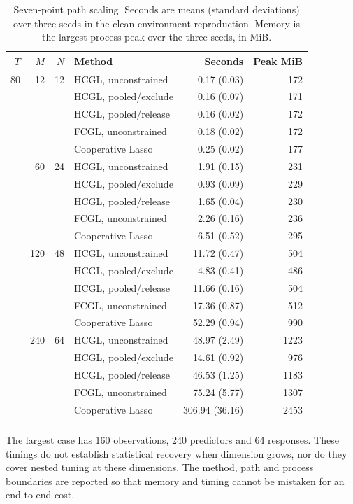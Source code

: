 \documentclass[11pt,a4paper]{article}
\begin{document}
\begin{table}[htbp]\centering\small\setlength{\tabcolsep}{5pt}
\caption{Seven-point path scaling. Seconds are means (standard deviations) over
three seeds in the clean-environment reproduction. Memory is the largest process peak over the three seeds, in MiB.}
\label{tab:scaling}
\begin{tabular}{rrrlrr}\toprule
$T$ & $M$ & $N$ & Method & Seconds & Peak MiB\\\midrule
80 & 12 & 12 & HCGL, unconstrained & 0.17 (0.03) & 172 \\
 &  &  & HCGL, pooled/exclude & 0.16 (0.07) & 171 \\
 &  &  & HCGL, pooled/release & 0.16 (0.02) & 172 \\
 &  &  & FCGL, unconstrained & 0.18 (0.02) & 172 \\
 &  &  & Cooperative Lasso & 0.25 (0.02) & 177 \\
\addlinespace
120 & 60 & 24 & HCGL, unconstrained & 1.91 (0.15) & 231 \\
 &  &  & HCGL, pooled/exclude & 0.93 (0.09) & 229 \\
 &  &  & HCGL, pooled/release & 1.65 (0.04) & 230 \\
 &  &  & FCGL, unconstrained & 2.26 (0.16) & 236 \\
 &  &  & Cooperative Lasso & 6.51 (0.52) & 295 \\
\addlinespace
160 & 120 & 48 & HCGL, unconstrained & 11.72 (0.47) & 504 \\
 &  &  & HCGL, pooled/exclude & 4.83 (0.41) & 486 \\
 &  &  & HCGL, pooled/release & 11.66 (0.16) & 504 \\
 &  &  & FCGL, unconstrained & 17.36 (0.87) & 512 \\
 &  &  & Cooperative Lasso & 52.29 (0.94) & 990 \\
\addlinespace
160 & 240 & 64 & HCGL, unconstrained & 48.97 (2.49) & 1223 \\
 &  &  & HCGL, pooled/exclude & 14.61 (0.92) & 976 \\
 &  &  & HCGL, pooled/release & 46.53 (1.25) & 1183 \\
 &  &  & FCGL, unconstrained & 75.24 (5.77) & 1307 \\
 &  &  & Cooperative Lasso & 306.94 (36.16) & 2453 \\
\addlinespace
\bottomrule\end{tabular}\end{table}

The largest case has 160 observations, 240 predictors and 64 responses. These timings
do not establish statistical recovery when dimension grows, nor do they cover
nested tuning at these dimensions. The method, path and process boundaries are
reported so that memory and timing cannot be mistaken for an end-to-end cost.
\end{document}
